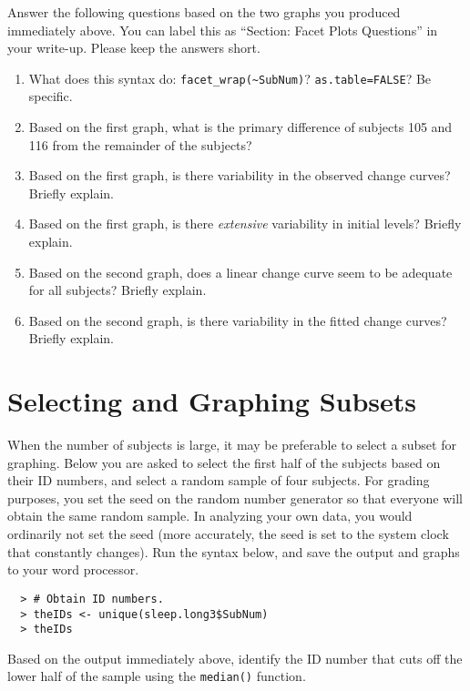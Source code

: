 \documentclass[]{article}
\begin{document}
\noindent Answer the following questions based on the two graphs you produced immediately above. You can label this as ``Section: Facet Plots Questions'' in your write-up. Please keep the answers short.

\begin{enumerate}[resume]
\item What does this syntax do: \verb|facet_wrap(~SubNum)|? \texttt{as.table=FALSE}? Be specific.
\item Based on the first graph, what is the primary difference of subjects 105 and 116 from the remainder of the subjects?
\item Based on the first graph, is there variability in the observed change curves? Briefly explain.
\item Based on the first graph, is there \emph{extensive} variability in initial levels? Briefly explain.
\item Based on the second graph, does a linear change curve seem to be adequate for all subjects? Briefly explain.
\item Based on the second graph, is there variability in the fitted change curves? Briefly explain.
\end{enumerate}


%
%
\pagebreak
\section*{Selecting and Graphing Subsets}

\noindent When the number of subjects is large, it may be preferable to select a subset for graphing. Below you are asked to select the first half of the subjects based on their ID numbers, and select a random sample of four subjects. For grading purposes, you set the seed on the random number generator so that everyone will obtain the same random sample. In analyzing your own data, you would ordinarily not set the seed (more accurately, the seed is set to the system clock that constantly changes). Run the syntax below, and save the output and graphs to your word processor.

\begin{verbatim}
  > # Obtain ID numbers.
  > theIDs <- unique(sleep.long3$SubNum)
  > theIDs
\end{verbatim}

\noindent Based on the output immediately above, identify the ID number that cuts off the lower half of the sample using the \texttt{median()} function.
\end{document}
